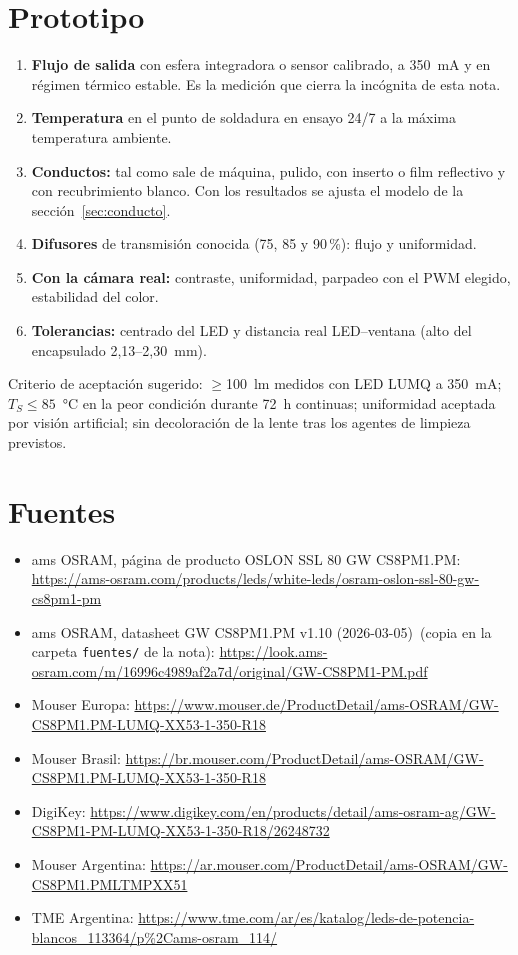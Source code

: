 \documentclass[11pt,a4paper]{article}
\newcommand{\dsref}{ams OSRAM, datasheet GW CS8PM1.PM v1.10 (2026-03-05)}
\begin{document}
\section{Prototipo}\label{sec:prototipo}
\begin{enumerate}
  \item \textbf{Flujo de salida} con esfera integradora o sensor calibrado, a 350~mA y en régimen térmico
        estable. Es la medición que cierra la incógnita de esta nota.
  \item \textbf{Temperatura} en el punto de soldadura en ensayo 24/7 a la máxima temperatura ambiente.
  \item \textbf{Conductos:} tal como sale de máquina, pulido, con inserto o film reflectivo y con recubrimiento
        blanco. Con los resultados se ajusta el modelo de la sección~\ref{sec:conducto}.
  \item \textbf{Difusores} de transmisión conocida (75, 85 y 90\,\%): flujo y uniformidad.
  \item \textbf{Con la cámara real:} contraste, uniformidad, parpadeo con el PWM elegido, estabilidad del color.
  \item \textbf{Tolerancias:} centrado del LED y distancia real LED--ventana (alto del encapsulado 2,13--2,30~mm).
\end{enumerate}

Criterio de aceptación sugerido: $\geq$100~lm medidos con LED LUMQ a 350~mA; $T_S \leq 85$~°C en la peor
condición durante 72~h continuas; uniformidad aceptada por visión artificial; sin decoloración de la lente tras
los agentes de limpieza previstos.

\section{Fuentes}
\begin{itemize}
  \item ams OSRAM, página de producto OSLON SSL 80 GW CS8PM1.PM:
        \url{https://ams-osram.com/products/leds/white-leds/osram-oslon-ssl-80-gw-cs8pm1-pm}
  \item \dsref\ (copia en la carpeta \texttt{fuentes/} de la nota):
        \url{https://look.ams-osram.com/m/16996c4989af2a7d/original/GW-CS8PM1-PM.pdf}
  \item Mouser Europa: \url{https://www.mouser.de/ProductDetail/ams-OSRAM/GW-CS8PM1.PM-LUMQ-XX53-1-350-R18}
  \item Mouser Brasil: \url{https://br.mouser.com/ProductDetail/ams-OSRAM/GW-CS8PM1.PM-LUMQ-XX53-1-350-R18}
  \item DigiKey: \url{https://www.digikey.com/en/products/detail/ams-osram-ag/GW-CS8PM1-PM-LUMQ-XX53-1-350-R18/26248732}
  \item Mouser Argentina: \url{https://ar.mouser.com/ProductDetail/ams-OSRAM/GW-CS8PM1.PMLTMPXX51}
  \item TME Argentina: \url{https://www.tme.com/ar/es/katalog/leds-de-potencia-blancos_113364/p%2Cams-osram_114/}
\end{itemize}
\end{document}
